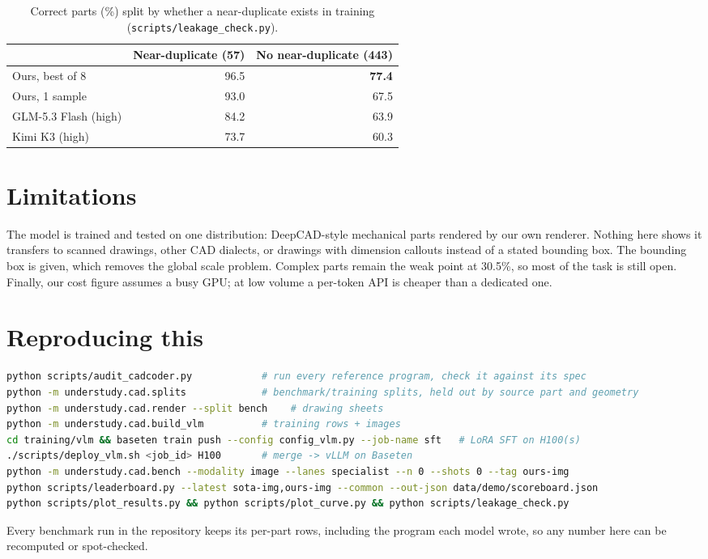 \documentclass[11pt]{article}
\begin{document}
\begin{table}[h]
\centering\small
\begin{tabular}{lrr}
\toprule
& Near-duplicate (57) & No near-duplicate (443) \\
\midrule
Ours, best of 8 & 96.5 & \textbf{77.4} \\
Ours, 1 sample & 93.0 & 67.5 \\
GLM-5.3 Flash (high) & 84.2 & 63.9 \\
Kimi K3 (high) & 73.7 & 60.3 \\
\bottomrule
\end{tabular}
\caption{Correct parts (\%) split by whether a near-duplicate exists in training
(\texttt{scripts/leakage\_check.py}).}
\label{tab:leakage}
\end{table}

\section{Limitations}

The model is trained and tested on one distribution: DeepCAD-style mechanical parts rendered by our own renderer.
Nothing here shows it transfers to scanned drawings, other CAD dialects, or drawings with dimension callouts instead
of a stated bounding box. The bounding box is given, which removes the global scale problem. Complex parts remain
the weak point at 30.5\%, so most of the task is still open. Finally, our cost figure assumes a busy GPU; at low
volume a per-token API is cheaper than a dedicated one.

\section{Reproducing this}

\begin{lstlisting}[language=bash]
python scripts/audit_cadcoder.py            # run every reference program, check it against its spec
python -m understudy.cad.splits             # benchmark/training splits, held out by source part and geometry
python -m understudy.cad.render --split bench    # drawing sheets
python -m understudy.cad.build_vlm          # training rows + images
cd training/vlm && baseten train push --config config_vlm.py --job-name sft   # LoRA SFT on H100(s)
./scripts/deploy_vlm.sh <job_id> H100       # merge -> vLLM on Baseten
python -m understudy.cad.bench --modality image --lanes specialist --n 0 --shots 0 --tag ours-img
python scripts/leaderboard.py --latest sota-img,ours-img --common --out-json data/demo/scoreboard.json
python scripts/plot_results.py && python scripts/plot_curve.py && python scripts/leakage_check.py
\end{lstlisting}

Every benchmark run in the repository keeps its per-part rows, including the program each model wrote, so any number
here can be recomputed or spot-checked.
\end{document}
